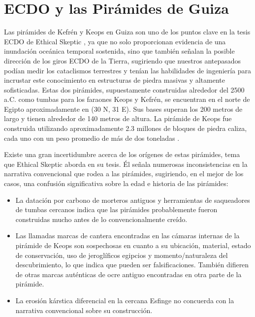 \documentclass[10pt,twocolumn,letterpaper]{article}
\begin{document}
\section{ECDO y las Pirámides de Guiza}

Las pirámides de Kefrén y Keops en Guiza son uno de los puntos clave en la tesis ECDO de Ethical Skeptic \cite{27}, ya que no solo proporcionan evidencia de una inundación oceánica temporal sostenida, sino que también señalan la posible dirección de los giros ECDO de la Tierra, sugiriendo que nuestros antepasados podían medir los cataclismos terrestres y tenían las habilidades de ingeniería para incrustar este conocimiento en estructuras de piedra masivas y altamente sofisticadas. Estas dos pirámides, supuestamente construidas alrededor del 2500 a.C. como tumbas para los faraones Keops y Kefrén, se encuentran en el norte de Egipto aproximadamente en (30 N, 31 E). Sus bases superan los 200 metros de largo y tienen alrededor de 140 metros de altura. La pirámide de Keops fue construida utilizando aproximadamente 2.3 millones de bloques de piedra caliza, cada uno con un peso promedio de más de dos toneladas \cite{24, 25}.

Existe una gran incertidumbre acerca de los orígenes de estas pirámides, tema que Ethical Skeptic aborda en su tesis. Él señala numerosas inconsistencias en la narrativa convencional que rodea a las pirámides, sugiriendo, en el mejor de los casos, una confusión significativa sobre la edad e historia de las pirámides:

\begin{flushleft}
\begin{itemize}
    \item La datación por carbono de morteros antiguos y herramientas de saqueadores de tumbas cercanos indica que las pirámides probablemente fueron construidas mucho antes de lo convencionalmente creído.
    \item Las llamadas marcas de cantera encontradas en las cámaras internas de la pirámide de Keops son sospechosas en cuanto a su ubicación, material, estado de conservación, uso de jeroglíficos egipcios y momento/naturaleza del descubrimiento, lo que indica que pueden ser falsificaciones. También difieren de otras marcas auténticas de ocre antiguo encontradas en otra parte de la pirámide.
    \item La erosión kárstica diferencial en la cercana Esfinge no concuerda con la narrativa convencional sobre su construcción.
\end{itemize}
\end{flushleft}
\end{document}
